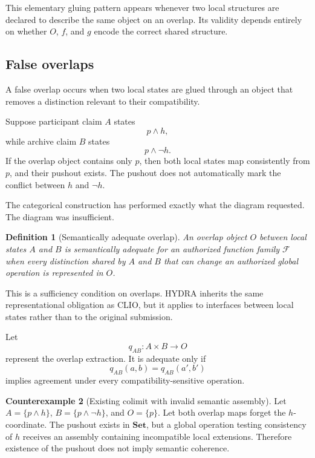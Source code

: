 \documentclass[11pt]{article}
\newtheorem{definition}{Definition}[section]
\theoremstyle{definition}
\newtheorem{counterexample}[definition]{Counterexample}
\newcommand{\F}{\mathcal{F}}
\begin{document}
This elementary gluing pattern appears whenever two local structures are declared to describe the same object on an overlap. Its validity depends entirely on whether \(O\), \(f\), and \(g\) encode the correct shared structure.

\subsection{False overlaps}

A false overlap occurs when two local states are glued through an object that removes a distinction relevant to their compatibility.

Suppose participant claim \(A\) states
\[
p\land h,
\]
while archive claim \(B\) states
\[
p\land\neg h.
\]
If the overlap object contains only \(p\), then both local states map consistently from \(p\), and their pushout exists. The pushout does not automatically mark the conflict between \(h\) and \(\neg h\).

The categorical construction has performed exactly what the diagram requested. The diagram was insufficient.

\begin{definition}[Semantically adequate overlap]
An overlap object \(O\) between local states \(A\) and \(B\) is semantically adequate for an authorized function family \(\F\) when every distinction shared by \(A\) and \(B\) that can change an authorized global operation is represented in \(O\).
\end{definition}

This is a sufficiency condition on overlaps. HYDRA inherits the same representational obligation as CLIO, but it applies to interfaces between local states rather than to the original submission.

Let
\[
q_{AB}:A\times B\to O
\]
represent the overlap extraction. It is adequate only if
\[
q_{AB}(a,b)=q_{AB}(a',b')
\]
implies agreement under every compatibility-sensitive operation.

\begin{counterexample}[Existing colimit with invalid semantic assembly]
Let \(A=\{p\land h\}\), \(B=\{p\land\neg h\}\), and \(O=\{p\}\). Let both overlap maps forget the \(h\)-coordinate. The pushout exists in \(\mathbf{Set}\), but a global operation testing consistency of \(h\) receives an assembly containing incompatible local extensions. Therefore existence of the pushout does not imply semantic coherence.
\end{counterexample}
\end{document}
